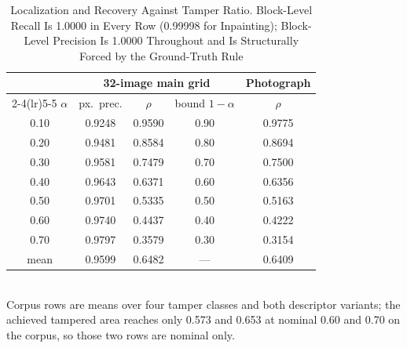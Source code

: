 \begin{table}[t]
\caption{Localization and Recovery Against Tamper Ratio. Block-Level Recall Is
1.0000 in Every Row (0.99998 for Inpainting); Block-Level Precision Is 1.0000
Throughout and Is Structurally Forced by the Ground-Truth Rule}
\label{tab:results}
\centering
\begin{tabular}{ccccc}
\toprule
 & \multicolumn{3}{c}{32-image main grid} & Photograph \\
\cmidrule(lr){2-4}\cmidrule(lr){5-5}
$\alpha$ & px.\ prec. & $\rho$ & bound $1-\alpha$ & $\rho$ \\
\midrule
0.10 & 0.9248 & 0.9590 & 0.90 & 0.9775 \\
0.20 & 0.9481 & 0.8584 & 0.80 & 0.8694 \\
0.30 & 0.9581 & 0.7479 & 0.70 & 0.7500 \\
0.40 & 0.9643 & 0.6371 & 0.60 & 0.6356 \\
0.50 & 0.9701 & 0.5335 & 0.50 & 0.5163 \\
0.60 & 0.9740 & 0.4437 & 0.40 & 0.4222 \\
0.70 & 0.9797 & 0.3579 & 0.30 & 0.3154 \\
\midrule
mean & 0.9599 & 0.6482 & --- & 0.6409 \\
\bottomrule
\end{tabular}
\\[2pt]
\footnotesize Corpus rows are means over four tamper classes and both descriptor
variants; the achieved tampered area reaches only 0.573 and 0.653 at nominal 0.60
and 0.70 on the corpus, so those two rows are nominal only.
\end{table}

